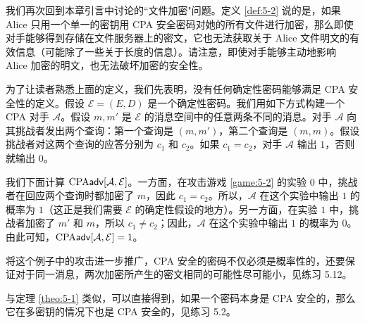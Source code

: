 我们再次回到本章引言中讨论的``文件加密"问题。定义 \ref{def:5-2} 说的是，如果 Alice 只用一个单一的密钥用 CPA 安全密码对她的所有文件进行加密，那么即使对手能够得到存储在文件服务器上的密文，它也无法获取关于 Alice 文件明文的有效信息（可能除了一些关于长度的信息）。请注意，即使对手能够主动地影响 Alice 加密的明文，也无法破坏加密的安全性。

\begin{example}\label{exmp:5-1}
为了让读者熟悉上面的定义，我们先表明，没有任何确定性密码能够满足 CPA 安全性的定义。假设 $\mathcal{E}=(E,D)$ 是一个确定性密码。我们用如下方式构建一个 CPA 对手 $\mathcal{A}$。假设 $m,m'$ 是 $\mathcal{E}$ 的消息空间中的任意两条不同的消息。对手 $\mathcal{A}$ 向其挑战者发出两个查询：第一个查询是 $(m,m')$，第二个查询是 $(m,m)$。假设挑战者对这两个查询的应答分别为 $c_1$ 和 $c_2$。如果 $c_1=c_2$，对手 $\mathcal{A}$ 输出 $1$，否则就输出 $0$。

我们下面计算 ${\rm CPA}\mathsf{adv}[\mathcal{A}, \mathcal{E}]$。一方面，在攻击游戏 \ref{game:5-2} 的实验 $0$ 中，挑战者在回应两个查询时都加密了 $m$，因此 $c_1=c_2$。所以，$\mathcal{A}$ 在这个实验中输出 $1$ 的概率为 $1$（这正是我们需要 $\mathcal{E}$ 的确定性假设的地方）。另一方面，在实验 $1$ 中，挑战者加密了 $m'$ 和 $m$，所以 $c_1\neq c_2$；因此，$\mathcal{A}$ 在这个实验中输出 $1$ 的概率为 $0$。由此可知，${\rm CPA}\mathsf{adv}[\mathcal{A}, \mathcal{E}]=1$。

将这个例子中的攻击进一步推广，CPA 安全的密码不仅必须是概率性的，还要保证对于同一消息，两次加密所产生的密文相同的可能性尽可能小，见练习 5.12。
\end{example}

\begin{remark}\label{remark:5-1}
与定理 \ref{theo:5-1} 类似，可以直接得到，如果一个密码本身是 CPA 安全的，那么它在多密钥的情况下也是 CPA 安全的，见练习 5.2。
\end{remark}
